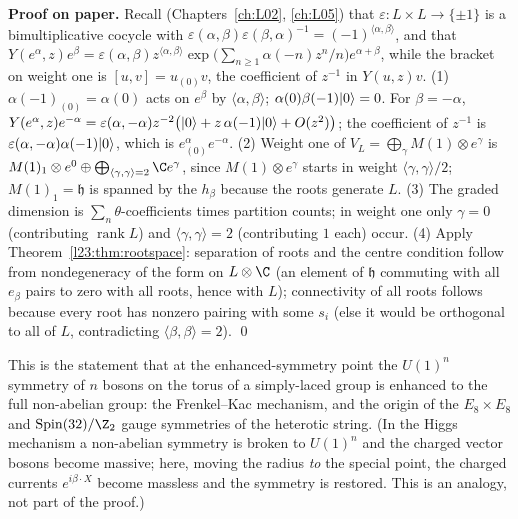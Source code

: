 \textbf{Proof on paper.} Recall (Chapters~\ref{ch:L02}, \ref{ch:L05}) that $\varepsilon:L\times L\to\{\pm1\}$ is a bimultiplicative
cocycle with $\varepsilon(\alpha,\beta)\varepsilon(\beta,\alpha)^{-1}=(-1)^{\langle\alpha,\beta\rangle}$, and that
$Y(e^\alpha,z)e^\beta=\varepsilon(\alpha,\beta)z^{\langle\alpha,\beta\rangle}\exp\big(\sum_{n\ge1}\alpha(-n)z^n/n\big)e^{\alpha+\beta}$, while the
bracket on weight one is $[u,v]=u_{(0)}v$, the coefficient of $z^{-1}$ in $Y(u,z)v$.
(1) $\alpha(-1)_{(0)}=\alpha(0)$ acts on $e^\beta$ by $\langle\alpha,\beta\rangle$; $\alpha(0)\beta(-1)|0\rangle=0$. For $\beta=-\alpha$,
$Y(e^\alpha,z)e^{-\alpha}=\varepsilon(\alpha,-\alpha)z^{-2}\big(|0\rangle+z\,\alpha(-1)|0\rangle+O(z^2)\big)$; the coefficient of $z^{-1}$ is
$\varepsilon(\alpha,-\alpha)\alpha(-1)|0\rangle$, which is $e^\alpha_{(0)}e^{-\alpha}$. (2) Weight one of $V_L=\bigoplus_\gamma
M(1)\otimes e^\gamma$ is $M(1)_1\otimes e^0\oplus\bigoplus_{\langle\gamma,\gamma\rangle=2}\C e^\gamma$, since $M(1)\otimes e^\gamma$ starts in
weight $\langle\gamma,\gamma\rangle/2$; $M(1)_1=\mathfrak h$ is spanned by the $h_\beta$ because the roots generate $L$. (3) The graded
dimension is $\sum_n\theta$-coefficients times partition counts; in weight one only $\gamma=0$ (contributing $\operatorname{rank}L$) and
$\langle\gamma,\gamma\rangle=2$ (contributing $1$ each) occur. (4) Apply Theorem~\ref{l23:thm:rootspace}: separation of roots and the centre
condition follow from nondegeneracy of the form on $L\otimes\C$ (an element of $\mathfrak h$ commuting with all $e_\beta$ pairs to zero
with all roots, hence with $L$); connectivity of all roots follows because every root has nonzero pairing with some $s_i$ (else it
would be orthogonal to all of $L$, contradicting $\langle\beta,\beta\rangle=2$). \qed

\begin{physics}
This is the statement that at the enhanced-symmetry point the $U(1)^n$ symmetry of $n$ bosons on the torus of a simply-laced group
is enhanced to the full non-abelian group: the Frenkel--Kac mechanism, and the origin of the $E_8\times E_8$ and
$\mathrm{Spin}(32)/\Z_2$ gauge symmetries of the heterotic string. (In the Higgs mechanism a non-abelian symmetry is broken to
$U(1)^n$ and the charged vector bosons become massive; here, moving the radius \emph{to} the special point, the charged currents
$e^{i\beta\cdot X}$ become massless and the symmetry is restored. This is an analogy, not part of the proof.)
\end{physics}

